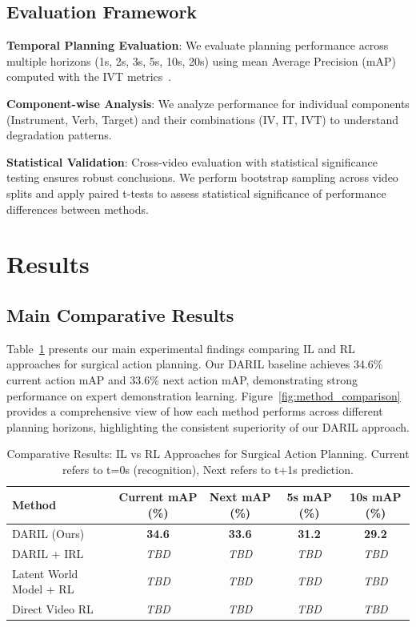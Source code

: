 \documentclass[runningheads]{llncs}
\begin{document}
\subsection{Evaluation Framework}

\textbf{Temporal Planning Evaluation}: We evaluate planning performance across multiple horizons (1s, 2s, 3s, 5s, 10s, 20s) using mean Average Precision (mAP) computed with the IVT metrics~\cite{nwoye2022data,nwoye2022cholect50}.

\textbf{Component-wise Analysis}: We analyze performance for individual components (Instrument, Verb, Target) and their combinations (IV, IT, IVT) to understand degradation patterns.

\textbf{Statistical Validation}: Cross-video evaluation with statistical significance testing ensures robust conclusions. We perform bootstrap sampling across video splits and apply paired t-tests to assess statistical significance of performance differences between methods.


\section{Results}

\subsection{Main Comparative Results}

Table~\ref{tab:main_results} presents our main experimental findings comparing IL and RL approaches for surgical action planning. Our DARIL baseline achieves 34.6\% current action mAP and 33.6\% next action mAP, demonstrating strong performance on expert demonstration learning. Figure~\ref{fig:method_comparison} provides a comprehensive view of how each method performs across different planning horizons, highlighting the consistent superiority of our DARIL approach.

\begin{table}[h]
\centering
\caption{Comparative Results: IL vs RL Approaches for Surgical Action Planning. Current refers to t=0s (recognition), Next refers to t+1s prediction.}
\label{tab:main_results}
\begin{tabular}{lcccc}
\toprule
\textbf{Method} & \textbf{Current mAP (\%)} & \textbf{Next mAP (\%)} & \textbf{5s mAP (\%)} & \textbf{10s mAP (\%)} \\
\midrule
DARIL (Ours) & \textbf{34.6} & \textbf{33.6} & \textbf{31.2} & \textbf{29.2} \\
\midrule
DARIL + IRL & \textit{TBD} & \textit{TBD} & \textit{TBD} & \textit{TBD} \\
Latent World Model + RL & \textit{TBD} & \textit{TBD} & \textit{TBD} & \textit{TBD} \\
Direct Video RL & \textit{TBD} & \textit{TBD} & \textit{TBD} & \textit{TBD} \\
\bottomrule
\end{tabular}
\end{table}
\end{document}
